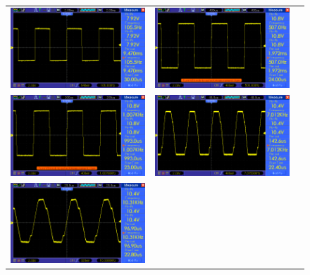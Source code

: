 \documentclass[14pt,a4paper]{extarticle}
\begin{document}
\begin{figure}[H]
\centering
\begin{tabular}{ccc}
    \includegraphics[width=.49\linewidth]{imgs/square100.png}&
    \includegraphics[width=.49\linewidth]{imgs/square500.png}\\
    \includegraphics[width=.49\linewidth]{imgs/square1k.png}&
    \includegraphics[width=.49\linewidth]{imgs/square7k.png}\\
    \includegraphics[width=.49\linewidth]{imgs/square10k.png}&        

\end{tabular}
\end{figure}
\end{document}
